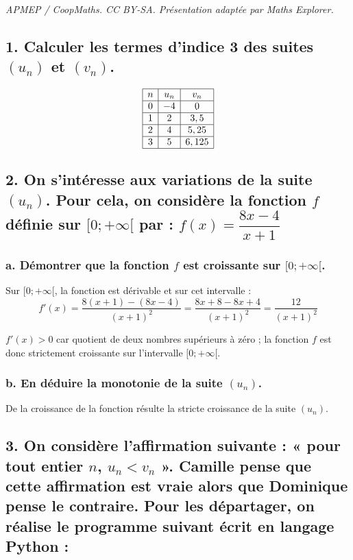 \documentclass[10pt]{article}
\begin{document}
\noindent\textit{APMEP / CoopMaths. CC BY-SA. Présentation adaptée par Maths Explorer.}\par\medskip
\subsection*{1. Calculer les termes d'indice 3 des suites $(u_n)$ et $(v_n)$.}
	
	\[
	\begin{array}{|c|c|c|}
		\hline
			n & u_n & v_n \\
		\hline
		0 & -4 & 0 \\
			\hline
		1 & 2 & 3,5 \\
			\hline
		2 & 4 & 5,25 \\
			\hline
		3 & 5 & 6,125 \\
			\hline
	\end{array}
	\]
	
	\subsection*{2. On s'intéresse aux variations de la suite $(u_n)$. Pour cela, on considère la fonction $f$ définie sur $[0; +\infty[$ par : $f(x) = \dfrac{8x - 4}{x + 1}$}
	
	\subsubsection*{a. Démontrer que la fonction $f$ est croissante sur $[0; +\infty[$.}
	
	Sur $[0; +\infty[$, la fonction est dérivable et sur cet intervalle :
	\[
	f'(x) = \dfrac{8(x + 1) - (8x - 4)}{(x + 1)^2} = \dfrac{8x + 8 - 8x + 4}{(x + 1)^2} = \dfrac{12}{(x + 1)^2}
	\]
	
	$f'(x) > 0$ car quotient de deux nombres supérieurs à zéro ; la fonction $f$ est donc strictement croissante sur l'intervalle $[0; +\infty[$.
	
	\subsubsection*{b. En déduire la monotonie de la suite $(u_n)$.}
	
	De la croissance de la fonction résulte la stricte croissance de la suite $(u_n)$.
	
	\subsection*{3. On considère l'affirmation suivante : « pour tout entier $n$, $u_n < v_n$ ». Camille pense que cette affirmation est vraie alors que Dominique pense le contraire. Pour les départager, on réalise le programme suivant écrit en langage Python :}
	
\end{document}
